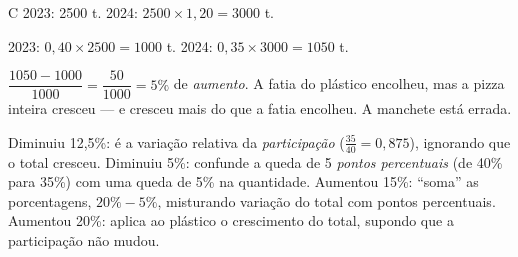 \begin{resolucao}{C}
 2023: \num{2500} t. 2024: $\num{2500}\times1{,}20=\num{3000}$ t.

 2023: $0{,}40\times\num{2500}=\num{1000}$ t. 2024: $0{,}35\times\num{3000}=\num{1050}$ t.

 $\dfrac{\num{1050}-\num{1000}}{\num{1000}}=\dfrac{50}{\num{1000}}=5\%$ de \emph{aumento}. A fatia do plástico encolheu, mas a pizza inteira cresceu — e cresceu mais do que a fatia encolheu. A manchete está errada.

\begin{distratores}
 Diminuiu 12,5\%: é a variação relativa da \emph{participação} ($\frac{35}{40}=0{,}875$), ignorando que o total cresceu.
 Diminuiu 5\%: confunde a queda de 5 \emph{pontos percentuais} (de 40\% para 35\%) com uma queda de 5\% na quantidade.
 Aumentou 15\%: “soma” as porcentagens, $20\%-5\%$, misturando variação do total com pontos percentuais.
 Aumentou 20\%: aplica ao plástico o crescimento do total, supondo que a participação não mudou.
\end{distratores}
\end{resolucao}

